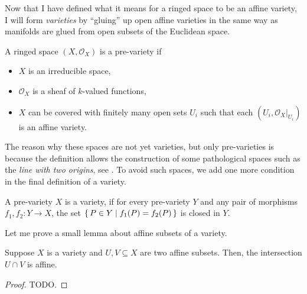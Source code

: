 Now that I have defined what it means for a ringed space to be an affine
variety, I will form \emph{varieties} by ``gluing'' up open affine varieties
in the same way as manifolds are glued from open subsets of the Euclidean
space.
\begin{defin}
  A ringed space $(X,\mathscr{O}_{X})$ is a pre-variety if
  \begin{itemize}
    \item $X$ is an irreducible space,
    \item $\mathscr{O}_{X}$ is a sheaf of $k$-valued functions,
    \item $X$ can be covered with finitely many open sets $U_{i}$
          such that each $(U_{i},\mathscr{O}_{X}\vert_{U_{i}})$ is
          an affine variety.
  \end{itemize}
\end{defin}
The reason why these spaces are not yet varieties, but only pre-varieties
is because the definition allows the construction of some pathological
spaces such as the \emph{line with two origins}, see \cite{gathmann}.
To avoid such spaces, we add one more condition in the final definition
of a variety.
\begin{defin}
  A pre-variety $X$ is a variety, if for every pre-variety $Y$ and any
  pair of morphisms $f_{1}, f_{2}: Y\to X$, the set
  $\set{P\in Y\mid f_{1}(P)=f_{2}(P)}$ is closed in $Y$.
\end{defin}
Let me prove a small lemma about affine subsets of a variety.
\begin{lemm}\label{lemm:affine_intersection}
  Suppose $X$ is a variety and $U, V\subseteq X$ are two affine subsets.
  Then, the intersection $U\cap V$ is affine.
\end{lemm}
\begin{proof}
  TODO.
\end{proof}


